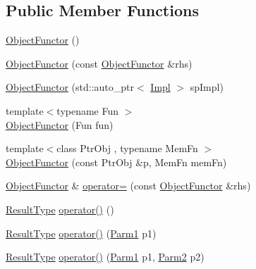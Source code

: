\subsection*{Public Member Functions}
\begin{DoxyCompactItemize}
\item 
\mbox{\hyperlink{classUtil_1_1ObjectFunctor_ac08a0820c0cf21a61abb6da3ede541d4}{Object\+Functor}} ()
\item 
\mbox{\hyperlink{classUtil_1_1ObjectFunctor_a2d42842ec3d69b317aaaafd65cd9e2fd}{Object\+Functor}} (const \mbox{\hyperlink{classUtil_1_1ObjectFunctor}{Object\+Functor}} \&rhs)
\item 
\mbox{\hyperlink{classUtil_1_1ObjectFunctor_a60702c933bbfec0d0a0e4459debe21b7}{Object\+Functor}} (std\+::auto\+\_\+ptr$<$ \mbox{\hyperlink{classUtil_1_1ObjectFunctor_a93fc635194d1d2768e73ba87d03abd8d}{Impl}} $>$ sp\+Impl)
\item 
{\footnotesize template$<$typename Fun $>$ }\\\mbox{\hyperlink{classUtil_1_1ObjectFunctor_a8a0c7fe30526a774ce94c7a24af4108d}{Object\+Functor}} (Fun fun)
\item 
{\footnotesize template$<$class Ptr\+Obj , typename Mem\+Fn $>$ }\\\mbox{\hyperlink{classUtil_1_1ObjectFunctor_a346fdbed7070eeafec9270c9a5a766ec}{Object\+Functor}} (const Ptr\+Obj \&p, Mem\+Fn mem\+Fn)
\item 
\mbox{\hyperlink{classUtil_1_1ObjectFunctor}{Object\+Functor}} \& \mbox{\hyperlink{classUtil_1_1ObjectFunctor_a90395c8be24965e154bee2f7813a78e8}{operator=}} (const \mbox{\hyperlink{classUtil_1_1ObjectFunctor}{Object\+Functor}} \&rhs)
\item 
\mbox{\hyperlink{classUtil_1_1ObjectFunctor_a77f816e98108848347d0dfc085090a1c}{Result\+Type}} \mbox{\hyperlink{classUtil_1_1ObjectFunctor_a47ff83bbdf075aefe2ee26aafafd88a1}{operator()}} ()
\item 
\mbox{\hyperlink{classUtil_1_1ObjectFunctor_a77f816e98108848347d0dfc085090a1c}{Result\+Type}} \mbox{\hyperlink{classUtil_1_1ObjectFunctor_affe11b4a42e49e60ac921c2353e3ce18}{operator()}} (\mbox{\hyperlink{classUtil_1_1ObjectFunctor_a199715d28029627c2ae7219c13b04d26}{Parm1}} p1)
\item 
\mbox{\hyperlink{classUtil_1_1ObjectFunctor_a77f816e98108848347d0dfc085090a1c}{Result\+Type}} \mbox{\hyperlink{classUtil_1_1ObjectFunctor_a95148ad6414e7e28998227841c27be6c}{operator()}} (\mbox{\hyperlink{classUtil_1_1ObjectFunctor_a199715d28029627c2ae7219c13b04d26}{Parm1}} p1, \mbox{\hyperlink{classUtil_1_1ObjectFunctor_a6809cf65883dc7575e01d9b9849649cf}{Parm2}} p2)

\end{DoxyCompactItemize}
